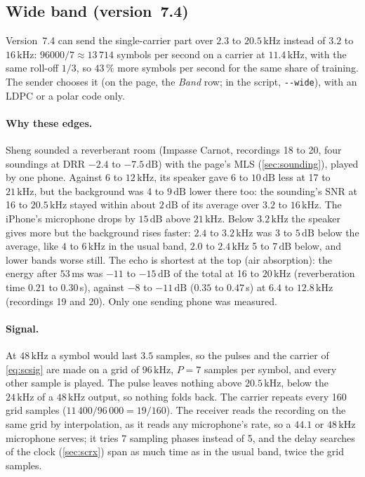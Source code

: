 \documentclass[11pt,a4paper]{article}
\newcommand{\kHz}{\,\mathrm{kHz}}
\newcommand{\ms}{\,\mathrm{ms}}
\newcommand{\dB}{\,\mathrm{dB}}
\newcommand{\code}[1]{\texttt{#1}}
\theoremstyle{remark}
\begin{document}
\subsection{Wide band (version~7.4)}
\label{sec:scwide}
Version~7.4 can send the single-carrier part over $2.3$ to $20.5\kHz$ instead of $3.2$ to $16\kHz$: $96000/7 \approx 13\,714$ symbols per second on a carrier at $11.4\kHz$, with the same roll-off $1/3$, so $43\,\%$ more symbols per second for the same share of training. The sender chooses it (on the page, the \emph{Band} row; in the script, \code{-{}-wide}), with an LDPC or a polar code only.

\paragraph{Why these edges.}
Sheng sounded a reverberant room (Impasse Carnot, recordings 18 to 20, four soundings at DRR $-2.4$ to $-7.5\dB$) with the page's MLS (\cref{sec:sounding}), played by one phone. Against $6$ to $12\kHz$, its speaker gave 6 to $10\dB$ less at 17 to $21\kHz$, but the background was 4 to $9\dB$ lower there too: the sounding's SNR at 16 to $20.5\kHz$ stayed within about $2\dB$ of its average over $3.2$ to $16\kHz$. The iPhone's microphone drops by $15\dB$ above $21\kHz$. Below $3.2\kHz$ the speaker gives more but the background rises faster: $2.4$ to $3.2\kHz$ was 3 to $5\dB$ below the average, like $4$ to $6\kHz$ in the usual band, $2.0$ to $2.4\kHz$ 5 to $7\dB$ below, and lower bands worse still. The echo is shortest at the top (air absorption): the energy after $53\ms$ was $-11$ to $-15\dB$ of the total at 16 to $20\kHz$ (reverberation time $0.21$ to $0.30$\,s), against $-8$ to $-11\dB$ ($0.35$ to $0.47$\,s) at $6.4$ to $12.8\kHz$ (recordings 19 and 20). Only one sending phone was measured.

\paragraph{Signal.}
At $48\kHz$ a symbol would last $3.5$ samples, so the pulses and the carrier of \cref{eq:scsig} are made on a grid of $96\kHz$, $P = 7$ samples per symbol, and every other sample is played. The pulse leaves nothing above $20.5\kHz$, below the $24\kHz$ of a $48\kHz$ output, so nothing folds back. The carrier repeats every 160 grid samples ($11\,400/96\,000 = 19/160$). The receiver reads the recording on the same grid by interpolation, as it reads any microphone's rate, so a $44.1$ or $48\kHz$ microphone serves; it tries 7 sampling phases instead of 5, and the delay searches of the clock (\cref{sec:scrx}) span as much time as in the usual band, twice the grid samples.
\end{document}
